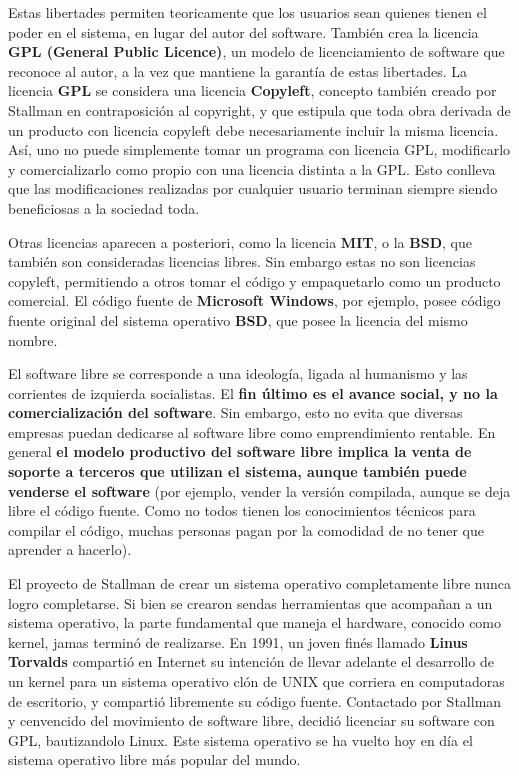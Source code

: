 Estas libertades permiten teoricamente que los usuarios sean quienes tienen el
poder en el sistema, en lugar del autor del software. También crea la licencia
\textbf{GPL (General Public Licence)}, un modelo de licenciamiento de software
que reconoce al autor, a la vez que mantiene la garantía de estas libertades.
La licencia \textbf{GPL} se considera una licencia \textbf{Copyleft}, concepto
también creado por Stallman en contraposición al copyright, y que estipula que
toda obra derivada de un producto con licencia copyleft debe necesariamente
incluir la misma licencia. Así, uno no puede simplemente tomar un programa con
licencia GPL, modificarlo y comercializarlo como propio con una licencia distinta
a la GPL. Esto conlleva que las modificaciones realizadas por cualquier usuario
terminan siempre siendo beneficiosas a la sociedad toda.

Otras licencias aparecen a posteriori, como la licencia \textbf{MIT}, o la
\textbf{BSD}, que también son consideradas licencias libres. Sin embargo estas
no son licencias copyleft, permitiendo a otros tomar el código y empaquetarlo
como un producto comercial. El código fuente de \textbf{Microsoft Windows},
por ejemplo, posee código fuente original del sistema operativo \textbf{BSD},
que posee la licencia del mismo nombre.

El software libre se corresponde a una ideología, ligada al humanismo y las
corrientes de izquierda socialistas. El \textbf{fin último es el avance social, y no
la comercialización del software}. Sin embargo, esto no evita que diversas
empresas puedan dedicarse al software libre como emprendimiento rentable. En
general \textbf{el modelo productivo del software libre implica la venta de soporte
a terceros que utilizan el sistema, aunque también puede venderse el software}
(por ejemplo, vender la versión compilada, aunque se deja libre el código fuente.
Como no todos tienen los conocimientos técnicos para compilar el código, muchas
personas pagan por la comodidad de no tener que aprender a hacerlo).

El proyecto de Stallman de crear un sistema operativo completamente libre nunca
logro completarse. Si bien se crearon sendas herramientas que acompañan a un
sistema operativo, la parte fundamental que maneja el hardware, conocido como
kernel, jamas terminó de realizarse. En 1991, un joven finés llamado \textbf{Linus
Torvalds} compartió en Internet su intención de llevar adelante el desarrollo de
un kernel para un sistema operativo clón de UNIX que corriera en computadoras de
escritorio, y compartió libremente su código fuente. Contactado por Stallman
y cenvencido del movimiento de software libre, decidió licenciar su software con
GPL, bautizandolo Linux. Este sistema operativo se ha vuelto hoy en día el
sistema operativo libre más popular del mundo.


